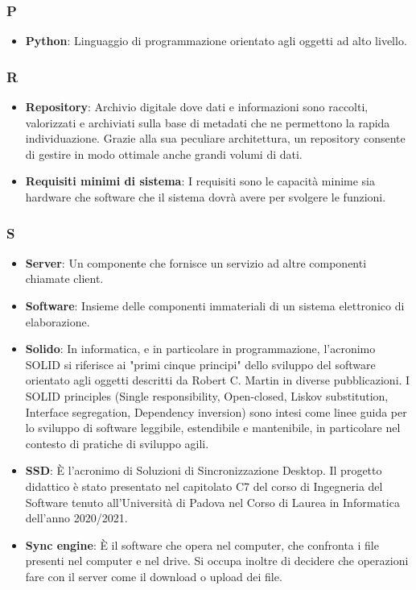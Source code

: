\subsubsection{P}
\begin{itemize}
	\item \textbf{Python}: Linguaggio di programmazione orientato agli oggetti ad alto livello.
\end{itemize}

\subsubsection{R}
\begin{itemize}
	\item \textbf{Repository}: Archivio digitale dove dati e informazioni sono raccolti, valorizzati e archiviati sulla base di metadati che ne permettono la rapida individuazione. Grazie alla sua peculiare architettura, un repository consente di gestire in modo ottimale anche grandi volumi di dati.
	\item \textbf{Requisiti minimi di sistema}: I requisiti sono le capacità minime sia hardware che software che il sistema dovrà avere per svolgere le funzioni.
\end{itemize}

\subsubsection{S}
\begin{itemize}
	\item \textbf{Server}: Un componente che fornisce un servizio ad altre componenti chiamate client.
	\item \textbf{Software}: Insieme delle componenti immateriali di un sistema elettronico di elaborazione.
	\item \textbf{Solido}: In informatica, e in particolare in programmazione, l'acronimo SOLID si riferisce ai "primi cinque principi" dello sviluppo del software orientato agli oggetti descritti da Robert C. Martin in diverse pubblicazioni. I SOLID principles (Single responsibility, Open-closed, Liskov substitution, Interface segregation, Dependency inversion) sono intesi come linee guida per lo sviluppo di software leggibile, estendibile e mantenibile, in particolare nel contesto di pratiche di sviluppo agili.
	\item \textbf{SSD}: È l'acronimo di Soluzioni di Sincronizzazione Desktop. Il progetto didattico è stato presentato nel capitolato C7 del corso di Ingegneria del Software tenuto all'Università di Padova nel Corso di Laurea in Informatica dell'anno 2020/2021.
	\item \textbf{Sync engine}: È il software che opera nel computer, che confronta i file presenti nel computer e nel drive. Si occupa inoltre di decidere che operazioni fare con il server come il download o upload dei file.
\end{itemize}

